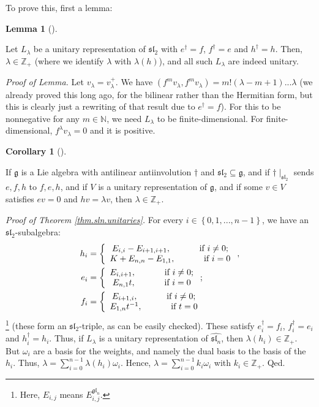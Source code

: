 \documentclass
[numbers=enddot,12pt,final,onecolumn,german,notitlepage]{scrartcl}%
\theoremstyle{definition}
\newtheorem{lem}[theo]{Lemma}
\newenvironment{lemma}[1][]
{\begin{lem}[#1]\begin{leftbar}}
{\end{leftbar}\end{lem}}
\newtheorem{coro}[theo]{Corollary}
\newenvironment{corollary}[1][]
{\begin{coro}[#1]\begin{leftbar}}
{\end{leftbar}\end{coro}}
\begin{document}
To prove this, first a lemma:

\begin{lemma}
Let $L_{\lambda}$ be a unitary representation of $\mathfrak{sl}_{2}$ with
$e^{\dag}=f$, $f^{\dag}=e$ and $h^{\dag}=h$. Then, $\lambda\in\mathbb{Z}_{+}$
(where we identify $\lambda$ with $\lambda\left(  h\right)  $), and all such
$L_{\lambda}$ are indeed unitary.
\end{lemma}

\textit{Proof of Lemma.} Let $v_{\lambda}=v_{\lambda}^{+}$. We have $\left(
f^{m}v_{\lambda},f^{m}v_{\lambda}\right)  =m!\left(  \lambda-m+1\right)
...\lambda$ (we already proved this long ago, for the bilinear rather than the
Hermitian form, but this is clearly just a rewriting of that result due to
$e^{\dag}=f$). For this to be nonnegative for any $m\in\mathbb{N}$, we need
$L_{\lambda}$ to be finite-dimensional. For finite-dimensional, $f^{\lambda
}v_{\lambda}=0$ and it is positive.

\begin{corollary}
If $\mathfrak{g}$ is a Lie algebra with antilinear antiinvolution $\dag$ and
$\mathfrak{sl}_{2}\subseteq\mathfrak{g}$, and if $\dag\mid_{\mathfrak{sl}_{2}%
}$ sends $e,f,h$ to $f,e,h$, and if $V$ is a unitary representation of
$\mathfrak{g}$, and if some $v\in V$ satisfies $ev=0$ and $hv=\lambda v$, then
$\lambda\in\mathbb{Z}_{+}$.
\end{corollary}

\textit{Proof of Theorem \ref{thm.sln.unitaries}.} For every $i\in\left\{
0,1,...,n-1\right\}  $, we have an $\mathfrak{sl}_{2}$-subalgebra:%
\begin{align*}
h_{i}  &  =\left\{
\begin{array}
[c]{c}%
E_{i,i}-E_{i+1,i+1},\ \ \ \ \ \ \ \ \ \ \text{if }i\neq0;\\
K+E_{n,n}-E_{1,1},\ \ \ \ \ \ \ \ \ \ \text{if }i=0
\end{array}
\right.  ,\\
e_{i}  &  =\left\{
\begin{array}
[c]{c}%
E_{i,i+1},\ \ \ \ \ \ \ \ \ \ \text{if }i\neq0;\\
E_{n,1}t,\ \ \ \ \ \ \ \ \ \ \text{if }i=0
\end{array}
\right.  ;\\
f_{i}  &  =\left\{
\begin{array}
[c]{c}%
E_{i+1,i},\ \ \ \ \ \ \ \ \ \ \text{if }i\neq0;\\
E_{1,n}t^{-1},\ \ \ \ \ \ \ \ \ \ \text{if }t=0
\end{array}
\right.
\end{align*}
\footnote{Here, $E_{i,j}$ means $E_{i,j}^{\mathfrak{gl}_{n}}$.} (these form an
$\mathfrak{sl}_{2}$-triple, as can be easily checked). These satisfy
$e_{i}^{\dag}=f_{i}$, $f_{i}^{\dag}=e_{i}$ and $h_{i}^{\dag}=h_{i}$. Thus, if
$L_{\lambda}$ is a unitary representation of $\widehat{\mathfrak{sl}_{n}}$,
then $\lambda\left(  h_{i}\right)  \in\mathbb{Z}_{+}$. But $\omega_{i}$ are a
basis for the weights, and namely the dual basis to the basis of the $h_{i}$.
Thus, $\lambda=\sum\limits_{i=0}^{n-1}\lambda\left(  h_{i}\right)  \omega_{i}%
$. Hence, $\lambda=\sum\limits_{i=0}^{n-1}k_{i}\omega_{i}$ with $k_{i}%
\in\mathbb{Z}_{+}$. Qed.
\end{document}
